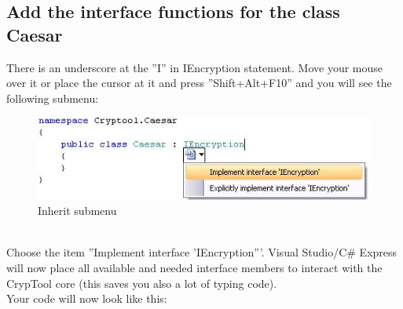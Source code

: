 \subsection{Add the interface functions for the class Caesar}
\label{sec:AddTheInterfaceFunctionsForTheClassCaesar}
There is an underscore at the ''I'' in IEncryption statement. Move your mouse over it or place the cursor at it and press ''Shift+Alt+F10'' and you will see the following submenu:
\begin{figure}[h!]
	\centering
		\includegraphics{figures/inherit_submenu.jpg}
	\caption{Inherit submenu}
	\label{fig:inherit_submenu}
\end{figure}\\
Choose the item ''Implement interface 'IEncryption'''. Visual Studio/C\# Express will now place all available and needed interface members to interact with the CrypTool core (this saves you also a lot of typing code).\\
Your code will now look like this:
